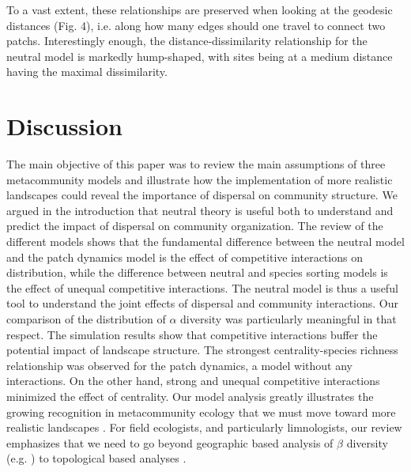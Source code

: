 \documentclass[12pt]{article}
\begin{document}
To a vast extent, these relationships are preserved when looking at the
geodesic distances (Fig. 4), i.e. along how many edges should one travel to
connect two patchs. Interestingly enough, the distance-dissimilarity
relationship for the neutral model is markedly hump-shaped, with sites being at
a medium distance having the maximal dissimilarity.

\section*{Discussion}

The main objective of this paper was to review the main assumptions of three
metacommunity models and illustrate how the implementation of more realistic
landscapes could reveal the importance of dispersal on community structure. We
argued in the introduction that neutral theory is useful both to understand and
predict the impact of dispersal on community organization. The review of the
different models shows that the fundamental difference between the neutral model
and the patch dynamics model is the effect of competitive interactions on
distribution, while the difference between neutral and species sorting
models is the effect of unequal competitive interactions. The neutral model is
thus a useful tool to understand the joint effects of dispersal and community
interactions. Our comparison of the distribution of $\alpha$ diversity was
particularly meaningful in that respect. The simulation results show that
competitive interactions buffer the potential impact of landscape structure. The
strongest centrality-species richness relationship was observed for the patch
dynamics, a model without any interactions. On the other hand, strong and
unequal competitive interactions minimized the effect of centrality. Our model
analysis greatly illustrates the growing recognition in metacommunity ecology
that we must move toward more realistic landscapes \parencite{Gilarranz2012}.
For field ecologists, and particularly limnologists, our review emphasizes that
we need to go beyond geographic based analysis of $\beta$ diversity (e.g.
\parencite{Legendre2005}) to topological based analyses
\parencite{dal10, Peterson2013}.
\end{document}
